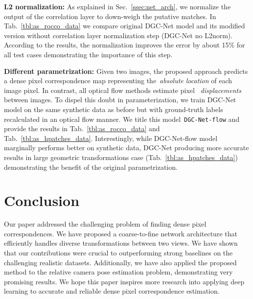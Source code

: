 \documentclass[10pt,twocolumn,letterpaper]{article}
\begin{document}
\noindent\textbf{L2 normalization:} As explained in Sec.~\ref{ssec:net_arch}, we  normalize the output of the correlation layer to down-weigh the putative matches. In Tab.~\ref{tbl:as_rocco_data} we compare original DGC-Net model and its modified version without correlation layer normalization step (DGC-Net no L2norm). According to the results, the normalization improves the error by about 15\% for all test cases demonstrating the importance of this step.

\noindent\textbf{Different parametrization:} Given two images, the proposed approach predicts a dense pixel correspondence map representing the~\textit{absolute location} of each image pixel. In contrast, all optical flow methods estimate pixel ~\textit{displacements} between images. To dispel this doubt in parameterization, we train DGC-Net model on the same synthetic data as before but with ground-truth labels recalculated in an optical flow manner. We title this model~\texttt{DGC-Net-flow} and provide the results in Tab.~\ref{tbl:as_rocco_data} and Tab.~\ref{tbl:as_hpatches_data}. Interestingly, while DGC-Net-flow model marginally performs better on synthetic data, DGC-Net producing more accurate results in large geometric transformations case (Tab.~\ref{tbl:as_hpatches_data}) demonstrating the benefit of the original parametrization.
\vspace{-2mm}
\section{Conclusion}
Our paper addressed the challenging problem of finding dense pixel correspondences. We have proposed a coarse-to-fine network architecture that efficiently handles diverse transformations between two views. We have shown that our contributions were crucial to outperforming strong baselines on the challenging realistic datasets. Additionally, we have also applied the proposed method to the relative camera pose estimation problem, demonstrating very promising results. We hope this paper inspires more research into applying deep learning to accurate and reliable dense pixel correspondence estimation.
\end{document}
